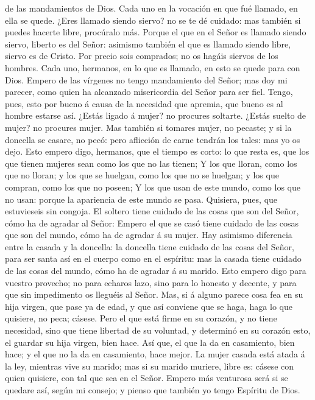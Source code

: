 de las mandamientos de Dios.  Cada uno en la vocación en
que fué llamado, en ella se quede.  ¿Eres llamado siendo
siervo? no se te dé cuidado: mas también si puedes hacerte libre,
procúralo más.  Porque el que en el Señor es llamado siendo
siervo, liberto es del Señor: asimismo también el que es llamado siendo
libre, siervo es de Cristo.  Por precio sois comprados; no
os hagáis siervos de los hombres.  Cada uno, hermanos, en
lo que es llamado, en esto se quede para con Dios.  Empero
de las vírgenes no tengo mandamiento del Señor; mas doy mi parecer, como
quien ha alcanzado misericordia del Señor para ser fiel. 
Tengo, pues, esto por bueno á causa de la necesidad que apremia, que
bueno es al hombre estarse así.  ¿Estás ligado á mujer? no
procures soltarte. ¿Estás suelto de mujer? no procures mujer.
 Mas también si tomares mujer, no pecaste; y si la doncella
se casare, no pecó: pero aflicción de carne tendrán los tales: mas yo os
dejo.  Esto empero digo, hermanos, que el tiempo es corto:
lo que resta es, que los que tienen mujeres sean como los que no las
tienen;  Y los que lloran, como los que no lloran; y los
que se huelgan, como los que no se huelgan; y los que compran, como los
que no poseen;  Y los que usan de este mundo, como los que
no usan: porque la apariencia de este mundo se pasa. 
Quisiera, pues, que estuvieseis sin congoja. El soltero tiene cuidado de
las cosas que son del Señor, cómo ha de agradar al Señor: 
Empero el que se casó tiene cuidado de las cosas que son del mundo, cómo
ha de agradar á su mujer.  Hay asimismo diferencia entre la
casada y la doncella: la doncella tiene cuidado de las cosas del Señor,
para ser santa así en el cuerpo como en el espíritu: mas la casada tiene
cuidado de las cosas del mundo, cómo ha de agradar á su marido.
 Esto empero digo para vuestro provecho; no para echaros
lazo, sino para lo honesto y decente, y para que sin impedimento os
lleguéis al Señor.  Mas, si á alguno parece cosa fea en su
hija virgen, que pase ya de edad, y que así conviene que se haga, haga
lo que quisiere, no peca; cásese.  Pero el que está firme
en su corazón, y no tiene necesidad, sino que tiene libertad de su
voluntad, y determinó en su corazón esto, el guardar su hija virgen,
bien hace.  Así que, el que la da en casamiento, bien hace;
y el que no la da en casamiento, hace mejor.  La mujer
casada está atada á la ley, mientras vive su marido; mas si su marido
muriere, libre es: cásese con quien quisiere, con tal que sea en el
Señor.  Empero más venturosa será si se quedare así, según
mi consejo; y pienso que también yo tengo Espíritu de Dios.

